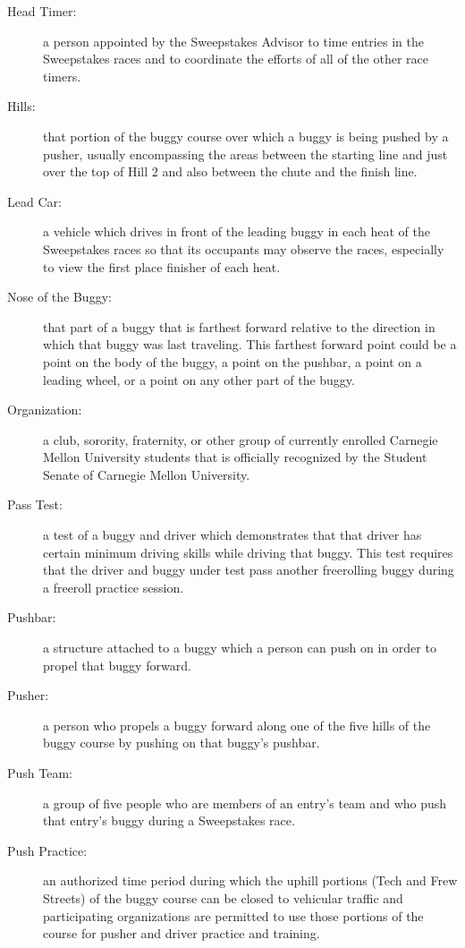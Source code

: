 \begin{description}
	\item[Head Timer:]
	a person appointed by the Sweepstakes Advisor to time entries in the
	Sweepstakes races and to coordinate the efforts of all of the other race
	timers.

	\item[Hills:]
	that portion of the buggy course over which a buggy is being pushed by a
	pusher, usually encompassing the areas between the starting line and just over
	the top of Hill 2 and also between the chute and the finish line.

	\item[Lead Car:]
	a vehicle which drives in front of the leading buggy in each heat of the
	Sweepstakes races so that its occupants may observe the races, especially to
	view the first place finisher of each heat.

	\item[Nose of the Buggy:]
	that part of a buggy that is farthest forward relative to the direction in
	which that buggy was last traveling. This farthest forward point could be a
	point on the body of the buggy, a point on the pushbar, a point on a leading
	wheel, or a point on any other part of the buggy.

	\item[Organization:]
	a club, sorority, fraternity, or other group of currently enrolled Carnegie
	Mellon University students that is officially recognized by the Student Senate
	of Carnegie Mellon University.

	\item[Pass Test:]
	a test of a buggy and driver which demonstrates that that driver has
	certain minimum driving skills while driving that buggy. This test requires
	that the driver and buggy under test pass another freerolling buggy during a
	freeroll practice session.

	\item[Pushbar:]
	a structure attached to a buggy which a person can push on in order to
	propel that buggy forward.

	\item[Pusher:]
	a person who propels a buggy forward along one of the five hills of the
	buggy course by pushing on that buggy's pushbar.

	\item[Push Team:]
	a group of five people who are members of an entry's team and who push that
	entry's buggy during a Sweepstakes race.

	\item[Push Practice:]
	an authorized time period during which the uphill portions (Tech and Frew
	Streets) of the buggy course can be closed to vehicular traffic and
	participating organizations are permitted to use those portions of the course
	for pusher and driver practice and training.


\end{description}
